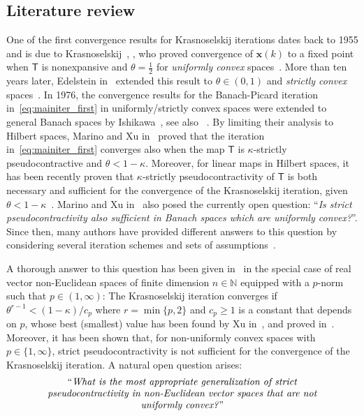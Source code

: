 \documentclass[journal,twoside,web]{ieeecolor}
\newcommand{\virg}[1]{``#1''}
\newcommand{\nat}{\mathbb{N}}
\newcommand{\xb}{\boldsymbol{x}}
\newcommand{\Ts}{\mathsf{T}}
\begin{document}
\subsection{Literature review}
%
One of the first convergence results for Krasnoselskij iterations dates back to 1955 and is due to Krasnoselskij~\cite{Krasnoselskii55}, \cite[Theorem 6.4.1]{Agarwal09}, who proved convergence of $\xb(k)$ to a fixed point when $\Ts$ is nonexpansive and $\theta = \frac{1}{2}$ for \textit{uniformly convex} spaces~\cite[Definition 1.8]{Berinde07}.
%
More than ten years later, Edelstein in~\cite{Edelstein66} extended this result to $\theta \in (0,1)$ and \textit{strictly convex} spaces~\cite[Definition 1.10]{Berinde07}.
%
In 1976, the convergence results for the Banach-Picard iteration in~\eqref{eq:mainiter_first} in uniformly/strictly convex spaces were extended to general Banach spaces by Ishikawa~\cite[Theorem 1]{ishikawa76}, see also ~\cite[Theorem 6.4.3]{Agarwal09}.
%
By limiting their analysis to Hilbert spaces, Marino and Xu in~\cite{Marino07} proved that the iteration in~\eqref{eq:mainiter_first} converges also when the map $\Ts$ is $\kappa$-strictly pseudocontractive and $\theta<1-\kappa$.
%
Moreover, for linear maps in Hilbert spaces, it has been recently proven that $\kappa$-strictly pseudocontractivity of $\Ts$ is both necessary and sufficient for the convergence of the Krasnoselskij iteration, given $\theta<1-\kappa$~\cite[Theorem 1]{Belgioioso18}. 
%
Marino and Xu in~\cite[Section 3]{Marino07} also posed the currently open question: \virg{\textit{Is strict pseudocontractivity also sufficient in Banach spaces which are uniformly convex?}}.
%
Since then, many authors have provided different answers to this question by considering several iteration schemes and sets of assumptions~\cite{zhang2009convergence,zhang2009strong,cai2010strong,zhou2010convergence,chidume2010weak,cholamjiak2010weak,cholamjiak2011strong}.
%

A thorough answer to this question has been given in~\cite{deplano25withapp} in the special case of real vector non-Euclidean spaces of finite dimension $n\in\nat$ equipped with a $p$-norm such that $p\in(1,\infty)$: The Krasnoselskij iteration converges if ${\theta^{r-1}<(1-\kappa)/c_p}$ where $r=\min\{p,2\}$ and $c_p\geq 1$ is a constant that depends on $p$, whose best (smallest) value has been found by Xu in~\cite[Corollary 2]{xu1991inequalities}, and proved in~\cite[Lemmas 4-5]{deplano25withapp}.
%
Moreover, it has been shown that, for non-uniformly convex spaces with $p\in\{1,\infty\}$, strict pseudocontractivity is not sufficient for the convergence of the Krasnoselskij iteration.
%
A natural open question arises:
%
\begin{equation}
\parbox{0.9\linewidth}{
\centering
\virg{\textit{What is the most appropriate generalization of strict pseudocontractivity
in non-Euclidean vector spaces that are not uniformly convex?}}
}
\label{eq:open_question}
\end{equation}
%
\end{document}
